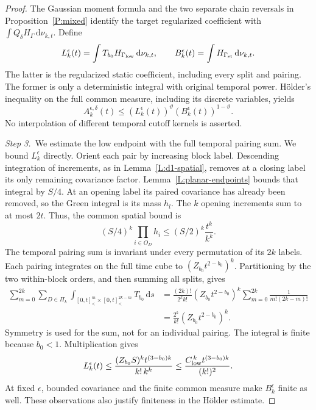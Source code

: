 \documentclass[12pt,oneside,openany]{book}
\numberwithin{equation}{section}
\theoremstyle{nogostyle}
\theoremstyle{definition}
\newcommand{\ud}{\,\mathrm{d}}
\begin{document}
\begin{proof}
  The Gaussian moment formula and the two separate chain reversals in
  Proposition~\ref{P:mixed} identify the target regularized coefficient with
  $\int Q_\delta H_\Gamma\ud\nu_{k,t}$. Define
  \[
    L_k^\epsilon(t)=\int T_{b_0}H_{\Gamma_{\rm low}}\ud\nu_{k,t},
    \qquad
    B_k^\epsilon(t)=\int H_{\Gamma_{\rm st}}\ud\nu_{k,t}.
  \]
  The latter is the regularized static coefficient, including every split and
  pairing. The former is only a deterministic integral with original temporal
  power. H\"older's inequality on the full common measure, including its
  discrete variables, yields
  \begin{equation}\label{E:planar-coefficient-holder}
    A_k^{\epsilon,\delta}(t)
    \le\left(L_k^\epsilon(t)\right)^\vartheta
    \left(B_k^\epsilon(t)\right)^{1-\vartheta}.
  \end{equation}
  No interpolation of different temporal cutoff kernels is asserted.


  \medskip
  \noindent\textit{Step 3.~}We estimate the low endpoint with the full
  temporal pairing sum.
  We bound $L_k^\epsilon$ directly. Orient each pair by increasing block label.
  Descending integration of increments, as in Lemma~\ref{L:d1-spatial}, removes
  at a closing label its only remaining covariance factor.
  Lemma~\ref{L:planar-endpoints} bounds that integral by $S/4$. At an opening
  label its paired covariance has already been removed, so the Green integral is
  its mass $h_l$. The $k$ opening increments sum to at most $2t$. Thus, the
  common spatial bound is
  \[
    (S/4)^k\prod_{i\in O_D}h_i
    \le(S/2)^k\frac{t^k}{k^k}.
  \]
  The temporal pairing sum is invariant under every permutation of its $2k$
  labels. Each pairing integrates on the full time cube to
  $(Z_{b_0}t^{2-b_0})^k$. Partitioning by the two within-block orders, and then
  summing all splits, gives
  \[
    \begin{split}
      \sum_{m=0}^{2k}\sum_{D\in\Pi_k}
      \int_{[0,t]^m_<\times[0,t]^{2k-m}_<}T_{b_0}\ud s
      &=\frac{(2k)!}{2^kk!}(Z_{b_0}t^{2-b_0})^k
      \sum_{m=0}^{2k}\frac1{m!(2k-m)!}\\
      &=\frac{2^k}{k!}(Z_{b_0}t^{2-b_0})^k.
    \end{split}
  \]
  Symmetry is used for the sum, not for an individual pairing. The integral is
  finite because $b_0 < 1$. Multiplication gives
  \begin{equation}\label{E:planar-low-coefficient}
    L_k^\epsilon(t)
    \le\frac{(Z_{b_0}S)^kt^{(3-b_0)k}}{k!\,k^k}
    \le\frac{C_{\rm low}^{\,k}t^{(3-b_0)k}}{(k!)^2}.
  \end{equation}
  At fixed $\epsilon$, bounded covariance and the finite common measure make
  $B_k^\epsilon$ finite as well. These observations also justify finiteness in
  the H\"older estimate.



\end{proof}
\end{document}
